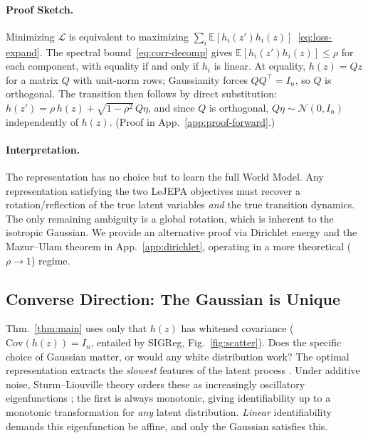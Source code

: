 \documentclass{article}
\begin{document}
\paragraph{Proof Sketch.}
Minimizing $\mathcal{L}$ is equivalent to maximizing $\sum_i \mathbb{E}[h_i(z') h_i(z)]$~\eqref{eq:loss-expand}.
The spectral bound~\eqref{eq:corr-decomp} gives $\mathbb{E}[h_i(z')h_i(z)] \leq \rho$ for each component, with equality if and only if $h_i$ is linear.
At equality, $h(z) = Qz$ for a matrix $Q$ with unit-norm rows; Gaussianity forces $QQ^\top = I_n$, so $Q$ is orthogonal.
The transition then follows by direct substitution: $h(z') = \rho\,h(z) + \sqrt{1-\rho^2}\,Q\eta$, and since $Q$ is orthogonal, $Q\eta \sim \mathcal{N}(0, I_n)$ independently of $h(z)$.
(Proof in App.~\ref{app:proof-forward}.)

\paragraph{Interpretation.}
The representation has no choice but to learn the full World Model.
Any representation satisfying the two LeJEPA objectives must recover a rotation/reflection of the true latent variables \textit{and} the true transition dynamics.
The only remaining ambiguity is a global rotation, which is inherent to the isotropic Gaussian.
We provide an alternative proof via Dirichlet energy and the Mazur--Ulam theorem in App.~\ref{app:dirichlet}, operating in a more theoretical ($\rho \to 1$) regime.





\subsection{Converse Direction: The Gaussian is Unique}\label{sec:converse}
Thm.~\ref{thm:main} uses only that $h(z)$ has whitened covariance ($\mathrm{Cov}(h(z)) = I_n$, entailed by SIGReg, Fig.~\ref{fig:scatter}). Does the specific choice of Gaussian matter, or would any white distribution work?
The optimal representation extracts the \textit{slowest} features of the latent process \citep{sobal2022slow}. Under additive noise, Sturm--Liouville theory orders these as increasingly oscillatory eigenfunctions \citep{sprekeler2014}; the first is always monotonic, giving identifiability up to a monotonic transformation for \emph{any} latent distribution. \emph{Linear} identifiability demands this eigenfunction be affine, and only the Gaussian satisfies this.
\end{document}
